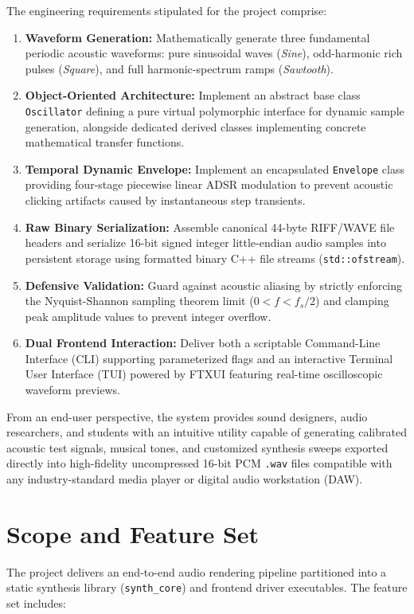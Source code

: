 \documentclass[12pt,a4paper,oneside]{book}
\begin{document}
The engineering requirements stipulated for the project comprise:
\begin{enumerate}
    \item \textbf{Waveform Generation:} Mathematically generate three fundamental periodic acoustic waveforms: pure sinusoidal waves (\textit{Sine}), odd-harmonic rich pulses (\textit{Square}), and full harmonic-spectrum ramps (\textit{Sawtooth}).
    \item \textbf{Object-Oriented Architecture:} Implement an abstract base class \texttt{Oscillator} defining a pure virtual polymorphic interface for dynamic sample generation, alongside dedicated derived classes implementing concrete mathematical transfer functions.
    \item \textbf{Temporal Dynamic Envelope:} Implement an encapsulated \texttt{Envelope} class providing four-stage piecewise linear ADSR modulation to prevent acoustic clicking artifacts caused by instantaneous step transients.
    \item \textbf{Raw Binary Serialization:} Assemble canonical 44-byte RIFF/WAVE file headers and serialize 16-bit signed integer little-endian audio samples into persistent storage using formatted binary C++ file streams (\texttt{std::ofstream}).
    \item \textbf{Defensive Validation:} Guard against acoustic aliasing by strictly enforcing the Nyquist-Shannon sampling theorem limit ($0 < f < f_s / 2$) and clamping peak amplitude values to prevent integer overflow.
    \item \textbf{Dual Frontend Interaction:} Deliver both a scriptable Command-Line Interface (CLI) supporting parameterized flags and an interactive Terminal User Interface (TUI) powered by FTXUI featuring real-time oscilloscopic waveform previews.
\end{enumerate}

From an end-user perspective, the system provides sound designers, audio researchers, and students with an intuitive utility capable of generating calibrated acoustic test signals, musical tones, and customized synthesis sweeps exported directly into high-fidelity uncompressed 16-bit PCM \texttt{.wav} files compatible with any industry-standard media player or digital audio workstation (DAW).

\section{Scope and Feature Set}
The project delivers an end-to-end audio rendering pipeline partitioned into a static synthesis library (\texttt{synth\_core}) and frontend driver executables. The feature set includes:
\end{document}
